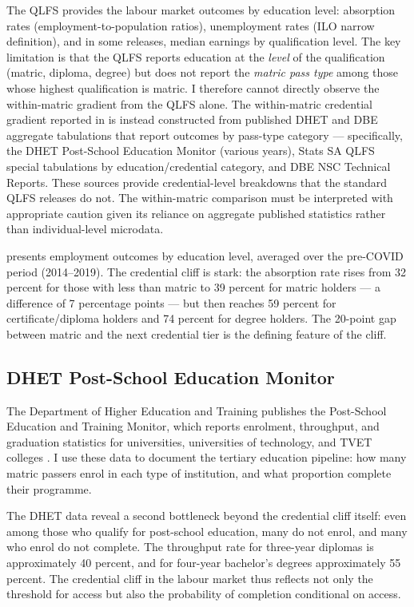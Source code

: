 \documentclass[12pt]{article}
\begin{document}
The QLFS provides the labour market outcomes by education level: absorption rates (employment-to-population ratios), unemployment rates (ILO narrow definition), and in some releases, median earnings by qualification level. The key limitation is that the QLFS reports education at the \emph{level} of the qualification (matric, diploma, degree) but does not report the \emph{matric pass type} among those whose highest qualification is matric. I therefore cannot directly observe the within-matric gradient from the QLFS alone. The within-matric credential gradient reported in  is instead constructed from published DHET and DBE aggregate tabulations that report outcomes by pass-type category --- specifically, the DHET Post-School Education Monitor (various years), Stats SA QLFS special tabulations by education/credential category, and DBE NSC Technical Reports. These sources provide credential-level breakdowns that the standard QLFS releases do not. The within-matric comparison must be interpreted with appropriate caution given its reliance on aggregate published statistics rather than individual-level microdata.

 presents employment outcomes by education level, averaged over the pre-COVID period (2014--2019). The credential cliff is stark: the absorption rate rises from 32 percent for those with less than matric to 39 percent for matric holders --- a difference of 7 percentage points --- but then reaches 59 percent for certificate/diploma holders and 74 percent for degree holders. The 20-point gap between matric and the next credential tier is the defining feature of the cliff.



\subsection{DHET Post-School Education Monitor}

The Department of Higher Education and Training publishes the Post-School Education and Training Monitor, which reports enrolment, throughput, and graduation statistics for universities, universities of technology, and TVET colleges \citep{dhet2020monitor}. I use these data to document the tertiary education pipeline: how many matric passers enrol in each type of institution, and what proportion complete their programme.

The DHET data reveal a second bottleneck beyond the credential cliff itself: even among those who qualify for post-school education, many do not enrol, and many who enrol do not complete. The throughput rate for three-year diplomas is approximately 40 percent, and for four-year bachelor's degrees approximately 55 percent. The credential cliff in the labour market thus reflects not only the threshold for access but also the probability of completion conditional on access.
\end{document}
